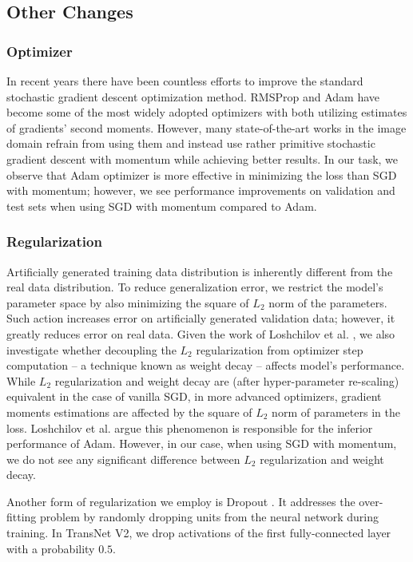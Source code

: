 \subsection{Other Changes}

\subsubsection{Optimizer}
In recent years there have been countless efforts to improve the standard stochastic gradient descent optimization method. RMSProp \cite{tieleman2012lecture} and Adam \cite{Adam14} have become some of the most widely adopted optimizers with both utilizing estimates of gradients' second moments. However, many state-of-the-art works in the image domain \cite{autoaugment, EfficientNet} refrain from using them and instead use rather primitive stochastic gradient descent with momentum while achieving better results. In our task, we observe that Adam optimizer is more effective in minimizing the loss than SGD with momentum; however, we see performance improvements on validation and test sets when using SGD with momentum compared to Adam.

\subsubsection{Regularization}
Artificially generated training data distribution is inherently different from the real data distribution. To reduce generalization error, we restrict the model's parameter space by also minimizing the square of $L_2$ norm of the parameters. Such action increases error on artificially generated validation data; however, it greatly reduces error on real data. Given the work of Loshchilov et al. \cite{FixingWeightDecay}, we also investigate whether decoupling the $L_2$ regularization from optimizer step computation -- a technique known as weight decay -- affects model's performance. While $L_2$ regularization and weight decay are (after hyper-parameter re-scaling) equivalent in the case of vanilla SGD, in more advanced optimizers, gradient moments estimations are affected by the square of $L_2$ norm of parameters in the loss. Loshchilov et al. argue this phenomenon is responsible for the inferior performance of Adam. However, in our case, when using SGD with momentum, we do not see any significant difference between $L_2$ regularization and weight decay.

Another form of regularization we employ is Dropout \cite{dropout}. It addresses the over-fitting problem by randomly dropping units from the neural network during training. In TransNet V2, we drop activations of the first fully-connected layer with a probability $0.5$.

